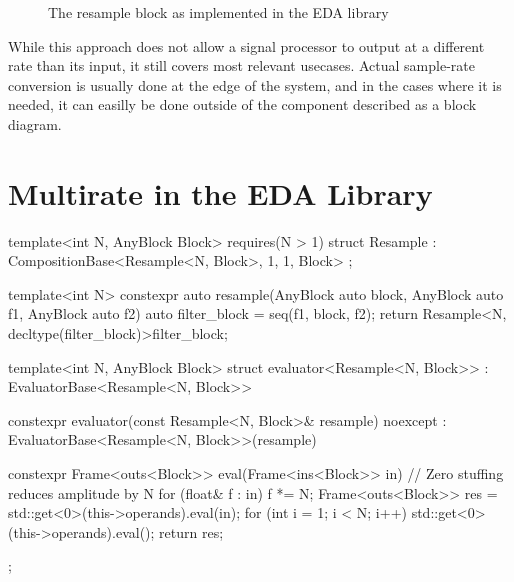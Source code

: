 \begin{figure}
  \centering
  \label{fig:block_resample}
  
  \caption{The resample block as implemented in the EDA library}
\end{figure}

While this approach does not allow a signal processor to output at a different rate than its input, it still
covers most relevant usecases. Actual sample-rate conversion is usually done at the edge of the system, and
in the cases where it is needed, it can easilly be done outside of the component described as a block
diagram.

\section{Multirate in the EDA Library}

\begin{cppcodenl}
  template<int N, AnyBlock Block>
  requires(N > 1)
  struct Resample : CompositionBase<Resample<N, Block>, 1, 1, Block> {};

  template<int N>
  constexpr auto resample(AnyBlock auto block, AnyBlock auto f1, AnyBlock auto f2)
  {
    auto filter_block = seq(f1, block, f2);
    return Resample<N, decltype(filter_block)>{{filter_block}};
  }
\end{cppcodenl}

\begin{cppcodenl}
  template<int N, AnyBlock Block>
  struct evaluator<Resample<N, Block>> : EvaluatorBase<Resample<N, Block>> {
    constexpr evaluator(const Resample<N, Block>& resample) noexcept 
      : EvaluatorBase<Resample<N, Block>>(resample) 
    {}

    constexpr Frame<outs<Block>> eval(Frame<ins<Block>> in)
    {
      // Zero stuffing reduces amplitude by N
      for (float& f : in) {
        f *= N;
      }
      Frame<outs<Block>> res = std::get<0>(this->operands).eval(in);
      for (int i = 1; i < N; i++) {
        std::get<0>(this->operands).eval({});
      }
      return res;
    }
  };
\end{cppcodenl}

